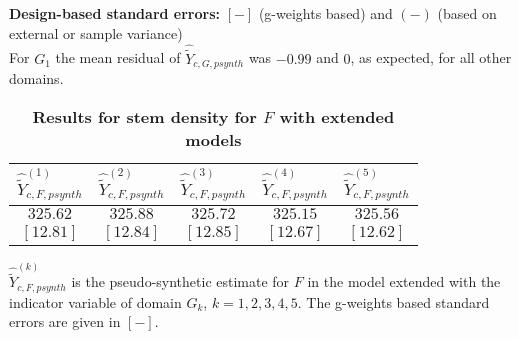 \documentclass[a4paper,12pt,leqno, titlepage]{article}
\begin{document}
\begin{table}[h]
\begin{center}
\begin{tabular}{l|c|c|c|c|c|}
\end{tabular}
\end{center}
\textbf{Design-based standard errors:} $[-]$ (g-weights based) and $(-)$ (based on external or sample variance)\\
For $G_1$ the mean residual of $ \hat{\tilde{Y}}_{c,G,psynth}$ was $-0.99$ and $0$, as expected, for all other domains.
\end{table}


\begin{table}[h]
\begin{center}
\caption{ \label{result4}\textbf{Results for stem density for $F$ with extended models}}
\end{center}
\begin{center}
 \begin{tabular}{|c|c|c|c|c|}\hline
  $\hat{\tilde{Y}}^{(1)}_{c,F,psynth}$  & $\hat{\tilde{Y}}^{(2)}_{c,F,psynth}$& $\hat{\tilde{Y}}^{(3)}_{c,F,psynth}$  & $\hat{\tilde{Y}}^{(4)}_{c,F,psynth}$ &  $\hat{\tilde{Y}}^{(5)}_{c,F,psynth}$ \\[1.0ex] \hline \hline
  $325.62$    & $325.88$  & $325.72$   & $325.15$   & $325.56$ \\[1.0ex]
  $[12.81]$   & $[12.84]$ & $[12.85]$  & $[12.67]$  & $[12.62]$ \\[1.0ex] \hline \hline
\end{tabular}
\end{center}
$\hat{\tilde{Y}}^{(k)}_{c,F,psynth}$ is the pseudo-synthetic estimate for $F$ in the model extended with the indicator variable of domain $G_k$, $k=1,2,3,4,5$. The g-weights based standard errors are given in $[-]$.
\end{table}
\end{document}
